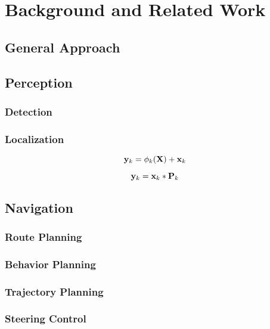 \chapter{Background and Related Work}
\label{chp:b2}

\section{General Approach}

\section{Perception}

\subsection{Detection}

\subsection{Localization}

\begin{equation}
{\bf y}_k = \phi_k ( {\bf X}) + {\bf x}_k
\label{eq:prn}
\end{equation}


\begin{equation}
{\bf y}_k = {\bf x}_k * {\bf P}_k
\end{equation}

\section{Navigation}

\subsection{Route Planning}
\subsection{Behavior Planning}
\subsection{Trajectory Planning}
\subsection{Steering Control}

